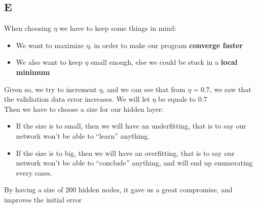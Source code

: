 \documentclass{article}
\begin{document}
        \subsection{E}
            When choosing $\eta$ we have to keep some things in mind:
            \begin{itemize}
                \item We want to maximize $\eta$, in order to make our program \textbf{converge faster}
                \item We also want to keep $\eta$ small enough, else we could be stuck in a \textbf{local minimum}
            \end{itemize}
            Given so, we try to increment $\eta$, and we can see that from $\eta=0.7$, we saw that the validiation data error increases. We will let $\eta$ be equals to 0.7\\

            Then we have to choose a size for our hidden layer:
            \begin{itemize}
                \item If the size is to small, then we will have an underfitting, that is to say our network won't be able to ``learn'' anything.
                \item If the size is to big, then we will have an overfitting, that is to say our network won't be able to ``conclude'' anything, and will end up enumerating every cases.
            \end{itemize}
            By having a size of 200 hidden nodes, it gave us a great compromise, and improves the initial error
\end{document}
